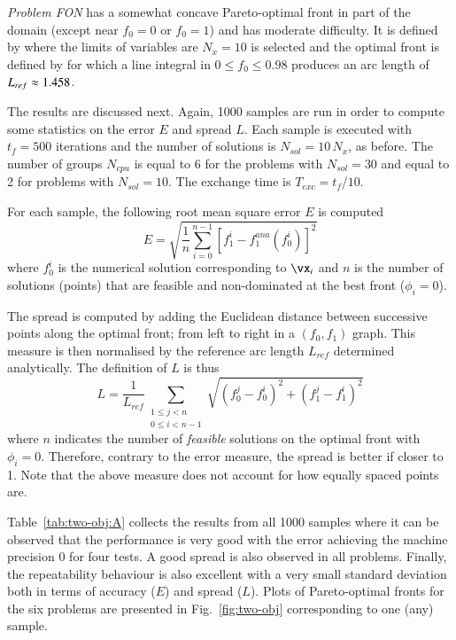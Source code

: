 \documentclass[final,5p,times,twocolumn]{elsarticle}
\newcommand{\figname} {Fig.}
\begin{document}
\emph{Problem FON} has a somewhat concave Pareto-optimal front in part of the domain (except near
$f_0=0$ or $f_0=1$) and has moderate difficulty. It is defined by
\FON
where the limits of variables are
\FONx
$N_x=10$ is selected and the optimal front is defined by
\FONfront
for which a line integral in $0 \leq f_0 \leq 0.98$ produces an arc length of $L_{ref} \approx 1.458$.


The results are discussed next. Again, 1000 samples are run in order to compute some statistics on
the error $E$ and spread $L$. Each sample is executed with $t_f=500$ iterations and the number of
solutions is ${N_{sol}=10\,N_x}$, as before. The number of groups $N_{cpu}$ is equal to 6 for the
problems with $N_{sol}=30$ and equal to 2 for problems with $N_{sol}=10$. The exchange time is
$T_{exc}=t_f/10$.

For each sample, the following root mean square error $E$ is computed
\begin{equation}
E = \sqrt{ \frac{1}{n} \sum_{i=0}^{n-1} \left[ f_1^{i} - f_1^{ana}(f_0^{i}) \right]^2 }
\end{equation}
where $f_0^i$ is the numerical solution corresponding to $\vx_i$ and $n$ is the number of solutions
(points) that are feasible and non-dominated at the best front ($\phi_i=0$).

The spread is computed by adding the Euclidean distance between successive points along the optimal
front; from left to right in a $(f_0,f_1)$ graph. This measure is then normalised by the reference
arc length $L_{ref}$ determined analytically. The definition of $L$ is thus
\begin{equation}
    L = \frac{1}{L_{ref}} \sum_{\substack{1 \leq j < n \\ 0 \leq i < n-1}} \sqrt{\left(f_0^j-f_0^i\right)^2 + \left(f_1^j-f_1^i\right)^2}
\end{equation}
where $n$ indicates the number of \emph{feasible} solutions on the optimal front with $\phi_i=0$.
Therefore, contrary to the error measure, the spread is better if closer to 1. Note that the
above measure does not account for how equally spaced points are.

Table~\ref{tab:two-obj:A} collects the results from all 1000 samples where it can be observed that
the performance is very good with the error achieving the machine precision 0 for four tests. A good
spread is also observed in all problems. Finally, the repeatability behaviour is also excellent with
a very small standard deviation both in terms of accuracy ($E$) and spread ($L$). Plots of
Pareto-optimal fronts for the six problems are presented in \figname~\ref{fig:two-obj} corresponding
to one (any) sample. 
\end{document}
